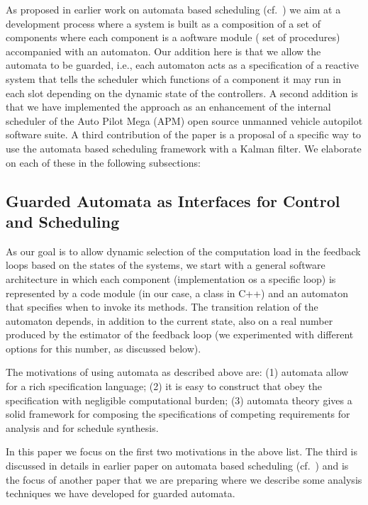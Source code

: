 \documentclass{sig-alternate-ipsn13}
\begin{document}
As proposed in earlier work on automata based scheduling (cf.~\cite{WA07,RTComposer,AW08}) we aim at a development process where a system is built as a composition of a set of components where each component is a aoftware module ( set of procedures) accompanied with an automaton. Our addition here is that we allow the automata to be guarded, i.e., each automaton acts as a specification of a reactive system that tells the scheduler which functions of a component it may run in each slot depending on the dynamic state of the controllers. A second addition is that we have implemented the approach as an enhancement of the internal scheduler of  the Auto Pilot Mega (APM) open source unmanned vehicle autopilot software suite. A third contribution of the paper is a proposal of a specific way to use the automata based scheduling framework with a Kalman filter. We elaborate on each of these in the following subsections:

\subsection{Guarded Automata as Interfaces for Control and Scheduling}
As our goal is to allow dynamic selection of the computation load in the feedback loops based on the states of the systems, we start with a general software architecture in which each component (implementation os a specific loop) is represented by a code module (in our case, a class in C++) and an automaton that specifies when to invoke its methods. The transition relation of the automaton depends, in addition to the current state, also on a real number produced by the estimator of the feedback loop (we experimented with different options for this number, as discussed below).

The motivations of using automata as described above are: (1) automata allow for a rich specification language; (2) it is easy to construct that obey the specification with negligible computational burden; (3) automata theory gives a solid framework for composing the specifications of competing requirements for analysis and for schedule synthesis. 

In this paper we focus on the first two motivations in the above list. The third is discussed in details in earlier paper on automata based scheduling (cf.~\cite{WA07,RTComposer,AW08}) and is the focus of another paper that we are preparing where we describe some analysis techniques we have developed for guarded automata.   
\end{document}
